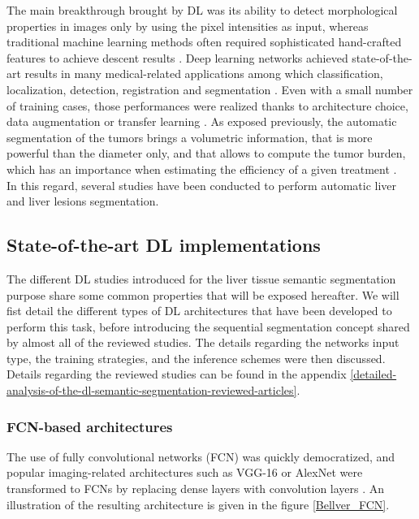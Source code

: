 The main breakthrough brought by DL was its ability to detect
morphological properties in images only by using the pixel intensities
as input, whereas traditional machine learning methods often required
sophisticated hand-crafted features to achieve descent results \cite{Litjens2017, Suzuki2017}. Deep learning networks achieved
state-of-the-art results in many medical-related applications among
which classification, localization, detection, registration and
segmentation \cite{Ker2017}. Even with a small number of
training cases, those performances were realized thanks to architecture
choice, data augmentation or transfer learning \cite{Zheng2018, Hu2018}.
As exposed previously, the automatic segmentation of the tumors brings a
volumetric information, that is more powerful than the diameter only,
and that allows to compute the tumor burden, which has an importance
when estimating the efficiency of a given treatment \cite{Gobbi2004, Bornemann2007, Heussel2007, Kuhnigk2006, Puesken2010, Bauknecht2010}.\\
In this regard, several studies have been conducted to perform automatic
liver and liver lesions segmentation.


\subsection{State-of-the-art DL implementations} \label{subsection:StateOfTheArtDlImplementations}

The different DL studies introduced for the liver tissue semantic
segmentation purpose share some common properties that will be exposed
hereafter. We will fist detail the different types of DL architectures that have been developed to perform this task, before introducing the sequential segmentation concept shared by almost all of the reviewed studies. The details regarding the networks input type, the training strategies, and the inference schemes were then discussed.
Details regarding the reviewed studies can be found in the appendix \ref{detailed-analysis-of-the-dl-semantic-segmentation-reviewed-articles}.

\subsubsection{FCN-based architectures}

The use of fully convolutional networks (FCN) was quickly democratized,
and popular imaging-related architectures such as VGG-16 or AlexNet
were transformed to FCNs by replacing dense layers with convolution
layers \cite{Ben-Cohen, Bellver2017}. An illustration of the resulting architecture is given in the figure \ref{Bellver_FCN}. 


